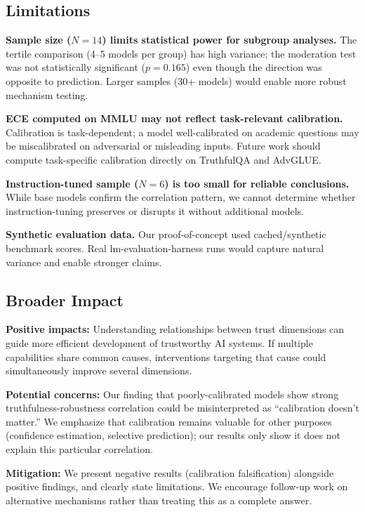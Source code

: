 \subsection{Limitations}

\textbf{Sample size ($N=14$) limits statistical power for subgroup analyses.} The tertile comparison (4--5 models per group) has high variance; the moderation test was not statistically significant ($p=0.165$) even though the direction was opposite to prediction. Larger samples (30+ models) would enable more robust mechanism testing.

\textbf{ECE computed on MMLU may not reflect task-relevant calibration.} Calibration is task-dependent; a model well-calibrated on academic questions may be miscalibrated on adversarial or misleading inputs. Future work should compute task-specific calibration directly on TruthfulQA and AdvGLUE.

\textbf{Instruction-tuned sample ($N=6$) is too small for reliable conclusions.} While base models confirm the correlation pattern, we cannot determine whether instruction-tuning preserves or disrupts it without additional models.

\textbf{Synthetic evaluation data.} Our proof-of-concept used cached/synthetic benchmark scores. Real lm-evaluation-harness runs would capture natural variance and enable stronger claims.

\subsection{Broader Impact}

\textbf{Positive impacts:} Understanding relationships between trust dimensions can guide more efficient development of trustworthy AI systems. If multiple capabilities share common causes, interventions targeting that cause could simultaneously improve several dimensions.

\textbf{Potential concerns:} Our finding that poorly-calibrated models show strong truthfulness-robustness correlation could be misinterpreted as ``calibration doesn't matter.'' We emphasize that calibration remains valuable for other purposes (confidence estimation, selective prediction); our results only show it does not explain this particular correlation.

\textbf{Mitigation:} We present negative results (calibration falsification) alongside positive findings, and clearly state limitations. We encourage follow-up work on alternative mechanisms rather than treating this as a complete answer.
